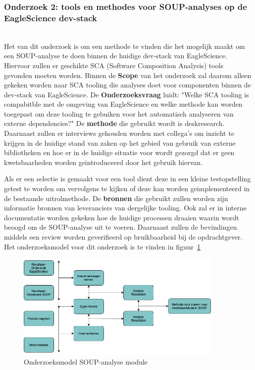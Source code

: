 \subsubsection{Onderzoek 2: tools en methodes voor SOUP-analyses op de EagleScience dev-stack}\\
Het  van dit onderzoek is om een methode te vinden die het mogelijk maakt om een SOUP-analyse te doen binnen de huidige dev-stack van EagleScience. Hiervoor zullen er geschikte SCA (Software Composition Analysis) tools gevonden moeten worden.
Binnen de \textbf{Scope} van het onderzoek zal daarom alleen gekeken worden naar SCA tooling die analyses doet voor componenten binnen de dev-stack van EagleScience.
De \textbf{Onderzoeksvraag} luidt: "Welke SCA tooling is compabitble met de omgeving van EagleScience en welke methode kan worden toegepast om deze tooling te gebuiken voor het automatisch analyseren van externe dependencies?"
De \textbf{methode} die gebruikt wordt is deskresearch. Daarnaast zullen er interviews gehouden worden met collega's om inzicht te krijgen in de huidige stand van zaken op het gebied van gebruik van externe bibliotheken en hoe er in de huidige situatie voor wordt gezorgd dat er geen kwetsbaarheden worden geintroduceerd door het gebruik hiervan.

Als er een selectie is gemaakt voor een tool dient deze in een kleine testopstelling getest te worden om vervolgens te kijken of deze kan worden geimplementeerd in de bestaande uitrolmethode. De \textbf{bronnen} die gebruikt zullen worden zijn informatie bronnen van leveranciers van dergelijke tooling. Ook zal er in interne documentatie worden gekeken hoe de huidige processen draaien waarin wordt beoogd om de SOUP-analyse uit te voeren. Daarnaast zullen de bevindingen middels een review worden geverifieerd op bruikbaarheid bij de opdrachtgever. Het onderzoeksmodel voor dit onderzoek is te vinden in figuur~\ref{fig:OnderzoeksModelSOUPmethode}

\begin{figure}[htbp]
    \myfloatalign
    \includegraphics[width=10cm]{gfx/OnderzoeksModelSOUPMethode}
    \caption{Onderzoeksmodel SOUP-analyse module}
    \label{fig:OnderzoeksModelSOUPmethode}
\end{figure}

